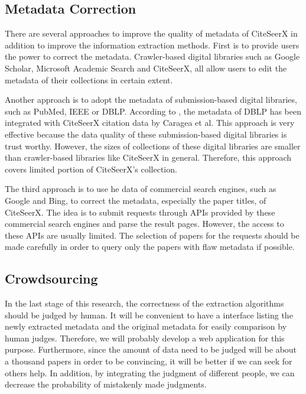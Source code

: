\documentclass[prodmode]{acmsmall} %
\begin{document}
\subsection{Metadata Correction}

There are several approaches to improve the quality of metadata of CiteSeerX in addition to improve the information extraction methods. First is to provide users the power to correct the metadata. Crawler-based digital libraries such as Google Scholar, Microsoft Academic Search and CiteSeerX, all allow users to edit the metadata of their collections in certain extent. \cite{wu2014impact}

Another approach is to adopt the metadata of submission-based digital libraries, such as PubMed, IEEE or DBLP. According to \cite{ororbiaciteseerx}, the metadata of DBLP has been integrated with CiteSeerX citation data by Caragea et al. This approach is very effective because the data quality of these submission-based digital libraries is trust worthy. However, the sizes of collections of these digital libraries are smaller than crawler-based libraries like CiteSeerX in general. Therefore, this approach covers limited portion of CiteSeerX's collection.

The third approach is to use he data of commercial search engines, such as Google and Bing, to correct the metadata, especially the paper titles, of CiteSeerX. The idea is to submit requests through APIs provided by these commercial search engines and parse the result pages. However, the access to these APIs are usually limited. The selection of papers for the requests should be made carefully in order to query only the papers with flaw metadata if possible. \cite{ororbiaciteseerx}

\subsection{Crowdsourcing}

In the last stage of this research, the correctness of the extraction algorithms should be judged by human. It will be convenient to have a interface listing the newly extracted metadata and the original metadata for easily comparison by human judges. Therefore, we will probably develop a web application for this purpose. Furthermore, since the amount of data need to be judged will be about a thousand papers in order to be convincing, it will be better if we can seek for others help. In addition, by integrating the judgment of different people, we can decrease the probability of mistakenly made judgments.
\end{document}
